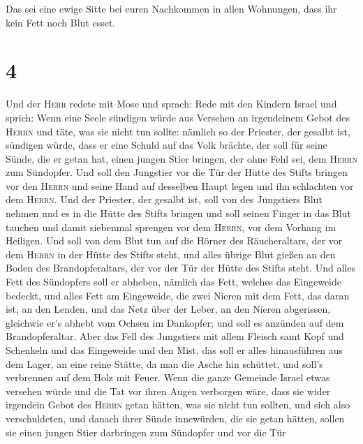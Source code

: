 Das sei eine ewige Sitte bei euren Nachkommen in allen
Wohnungen, dass ihr kein Fett noch Blut esset.

\hypertarget{section-3}{%
\section{4}\label{section-3}}

 Und der \textsc{Herr} redete mit Mose und sprach:
 Rede mit den Kindern Israel und sprich: Wenn eine Seele
sündigen würde aus Versehen an irgendeinem Gebot des \textsc{Herrn} und
täte, was sie nicht tun sollte:  nämlich so der Priester,
der gesalbt ist, sündigen würde, dass er eine Schuld auf das Volk
brächte, der soll für seine Sünde, die er getan hat, einen jungen Stier
bringen, der ohne Fehl sei, dem \textsc{Herrn} zum Sündopfer.
 Und soll den Jungstier vor die Tür der Hütte des Stifts
bringen vor den \textsc{Herrn} und seine Hand auf desselben Haupt legen
und ihn schlachten vor dem \textsc{Herrn}.  Und der
Priester, der gesalbt ist, soll von des Jungstiers Blut nehmen und es in
die Hütte des Stifts bringen  und soll seinen Finger in
das Blut tauchen und damit siebenmal sprengen vor dem \textsc{Herrn},
vor dem Vorhang im Heiligen.  Und soll von dem Blut tun
auf die Hörner des Räucheraltars, der vor dem \textsc{Herrn} in der
Hütte des Stifts steht, und alles übrige Blut gießen an den Boden des
Brandopferaltars, der vor der Tür der Hütte des Stifts steht.
 Und alles Fett des Sündopfers soll er abheben, nämlich
das Fett, welches das Eingeweide bedeckt, und alles Fett am Eingeweide,
 die zwei Nieren mit dem Fett, das daran ist, an den
Lenden, und das Netz über der Leber, an den Nieren abgerissen,
 gleichwie er's abhebt vom Ochsen im Dankopfer; und soll
es anzünden auf dem Brandopferaltar.  Aber das Fell des
Jungstiers mit allem Fleisch samt Kopf und Schenkeln und das Eingeweide
und den Mist,  das soll er alles hinausführen aus dem
Lager, an eine reine Stätte, da man die Asche hin schüttet, und soll's
verbrennen auf dem Holz mit Feuer.  Wenn die ganze
Gemeinde Israel etwas versehen würde und die Tat vor ihren Augen
verborgen wäre, dass sie wider irgendein Gebot des \textsc{Herrn} getan
hätten, was sie nicht tun sollten, und sich also verschuldeten,
 und danach ihrer Sünde innewürden, die sie getan hätten,
sollen sie einen jungen Stier darbringen zum Sündopfer und vor die Tür
